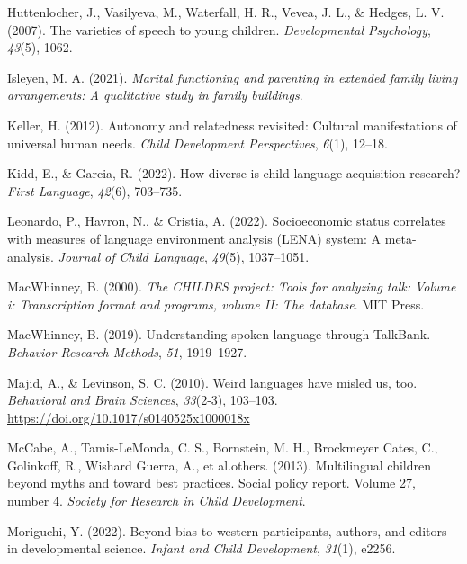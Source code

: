 \documentclass[
  man,floatsintext]{apa6}
\newlength{\cslhangindent}
\newlength{\cslentryspacingunit} %
\newenvironment{CSLReferences}[2] %
 {%
  \setlength{\parindent}{0pt}
  \ifodd #1
  \let\oldpar\par
  \def\par{\hangindent=\cslhangindent\oldpar}
  \fi
  \setlength{\parskip}{#2\cslentryspacingunit}
 }%
 {}
\begin{document}
\begin{CSLReferences}{1}{0}
\leavevmode{}%
Huttenlocher, J., Vasilyeva, M., Waterfall, H. R., Vevea, J. L., \& Hedges, L. V. (2007). The varieties of speech to young children. \emph{Developmental Psychology}, \emph{43}(5), 1062.

\leavevmode{}%
Isleyen, M. A. (2021). \emph{Marital functioning and parenting in extended family living arrangements: A qualitative study in family buildings}.

\leavevmode{}%
Keller, H. (2012). Autonomy and relatedness revisited: Cultural manifestations of universal human needs. \emph{Child Development Perspectives}, \emph{6}(1), 12--18.

\leavevmode{}%
Kidd, E., \& Garcia, R. (2022). How diverse is child language acquisition research? \emph{First Language}, \emph{42}(6), 703--735.

\leavevmode{}%
Leonardo, P., Havron, N., \& Cristia, A. (2022). Socioeconomic status correlates with measures of language environment analysis (LENA) system: A meta-analysis. \emph{Journal of Child Language}, \emph{49}(5), 1037--1051.

\leavevmode{}%
MacWhinney, B. (2000). \emph{The CHILDES project: Tools for analyzing talk: Volume i: Transcription format and programs, volume II: The database}. MIT Press.

\leavevmode{}%
MacWhinney, B. (2019). Understanding spoken language through TalkBank. \emph{Behavior Research Methods}, \emph{51}, 1919--1927.

\leavevmode{}%
Majid, A., \& Levinson, S. C. (2010). Weird languages have misled us, too. \emph{Behavioral and Brain Sciences}, \emph{33}(2-3), 103--103. \url{https://doi.org/10.1017/s0140525x1000018x}

\leavevmode{}%
McCabe, A., Tamis-LeMonda, C. S., Bornstein, M. H., Brockmeyer Cates, C., Golinkoff, R., Wishard Guerra, A., et al.others. (2013). Multilingual children beyond myths and toward best practices. Social policy report. Volume 27, number 4. \emph{Society for Research in Child Development}.

\leavevmode{}%
Moriguchi, Y. (2022). Beyond bias to western participants, authors, and editors in developmental science. \emph{Infant and Child Development}, \emph{31}(1), e2256.


\end{CSLReferences}
\end{document}
